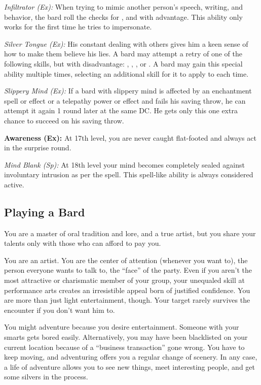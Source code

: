 \textit{Infiltrator (Ex):} When trying to mimic another person's speech, writing, and behavior, the bard roll the checks for ,  and  with advantage. This ability only works for the first time he tries to impersonate.

\textit{Silver Tongue (Ex):} His constant dealing with others gives him a keen sense of how to make them believe his lies. A bard may attempt a retry of one of the following skills, but with disadvantage: , , , or . A bard may gain this special ability multiple times, selecting an additional skill for it to apply to each time.

\textit{Slippery Mind (Ex):} If a bard with slippery mind is affected by an enchantment spell or effect or a telepathy power or effect and fails his saving throw, he can attempt it again 1 round later at the same DC. He gets only this one extra chance to succeed on his saving throw.

\textbf{Awareness (Ex):} At 17th level, you are never caught flat-footed and always act in the surprise round.

\textit{Mind Blank (Sp):} At 18th level your mind becomes completely sealed against involuntary intrusion as per the  spell. This spell-like ability is always considered active.

\subsection{Playing a Bard}

You are a master of oral tradition and lore, and a true artist, but you share your talents only with those who can afford to pay you.

You are an artist. You are the center of attention (whenever you want to), the person everyone wants to talk to, the ``face'' of the party. Even if you aren't the most attractive or charismatic member of your group, your unequaled skill at performance arts creates an irresistible appeal born of justified confidence. You are more than just light entertainment, though. Your target rarely survives the encounter if you don't want him to.

You might adventure because you desire entertainment. Someone with your smarts gets bored easily. Alternatively, you may have been blacklisted on your current location because of a ``business transaction'' gone wrong. You have to keep moving, and adventuring offers you a regular change of scenery. In any case, a life of adventure allows you to see new things, meet interesting people, and get some silvers in the process.

